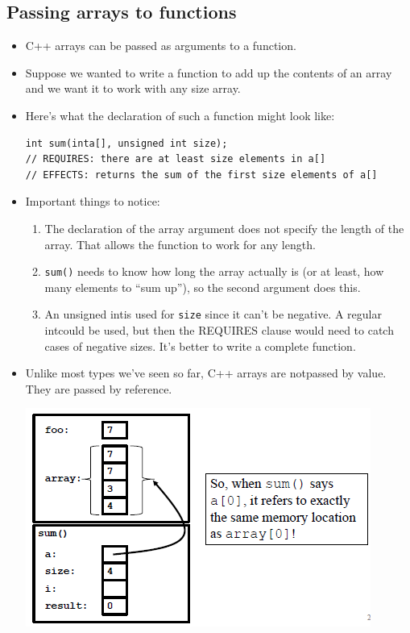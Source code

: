 \subsection{Passing arrays to functions}
\begin{itemize}
	\item C++ arrays can be passed as arguments to a function.
	\item Suppose we wanted to write a function to add up the contents of an array and we want it to work with any size array.
	\item Here's what the declaration of such a function might look like:
\begin{lstlisting}[style=C++]
int sum(inta[], unsigned int size);
// REQUIRES: there are at least size elements in a[]
// EFFECTS: returns the sum of the first size elements of a[]
\end{lstlisting}

	\item Important things to notice:
	\begin{enumerate}
		\item The declaration of the array argument does not specify the length of the array. That allows the function to work for any length.
		\item \lstinline[style=C++]{sum()} needs to know how long the array actually is (or at least, how many elements to ``sum up''), so the second argument does this.
		\item An unsigned intis used for \lstinline[style=C++]{size} since it can’t be negative. A regular intcould be used, but then the REQUIRES clause would need to catch cases of negative sizes. It’s better to write a complete function.
	\end{enumerate}

	\item Unlike most types we've seen so far, C++ arrays are notpassed by value. They are passed by reference.
	\begin{center}
		\includegraphics[scale=0.9]{sections/lec6/m3.png}
	\end{center}


\end{itemize}
